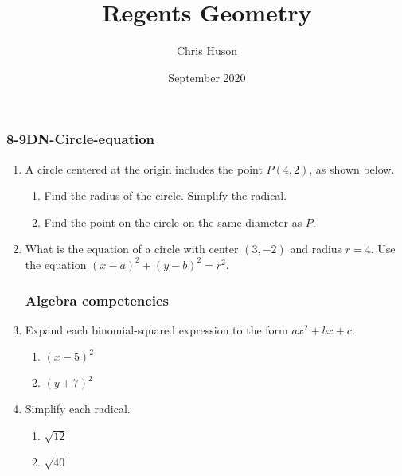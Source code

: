 \documentclass[12pt, twoside]{article}
\title{Regents Geometry}
\author{Chris Huson}
\date{September 2020}
\begin{document}
\subsubsection*{8-9DN-Circle-equation}
\begin{enumerate}
\item A circle centered at the origin includes the point $P(4,2)$, as shown below.
  \begin{multicols}{2}
    \raggedcolumns
    \begin{enumerate}
      \item Find the radius of the circle. Simplify the radical. \vspace{2.7cm}
      \item Find the point on the circle on the same diameter as $P$.
    \end{enumerate}
  \end{multicols}

\item What is the equation of a circle with center $(3,-2)$ and radius $r=4$. Use the equation $(x-a)^2+(y-b)^2=r^2$. \vspace{1.5cm}
  
\subsubsection*{Algebra competencies}
\item Expand each binomial-squared expression to the form $ax^2+bx+c$.
  \begin{multicols}{2}
  \begin{enumerate}[itemsep=3cm]
    \item $(x-5)^2$ 
    \item $(y+7)^2$ 
  \end{enumerate}
  \end{multicols}\vspace{3cm}
  
\item Simplify each radical.
  \begin{multicols}{2}
    \begin{enumerate}[itemsep=2cm]
      \item $\sqrt{12}$ 
      \item $\sqrt{40}$
    \end{enumerate}
    \end{multicols}\vspace{2cm}


\end{enumerate}
\end{document}
